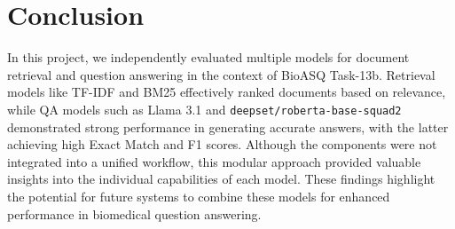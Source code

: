 \documentclass{article}
\begin{document}
\section{Conclusion}
In this project, we independently evaluated multiple models for document retrieval and question answering in the context of BioASQ Task-13b. Retrieval models like TF-IDF and BM25 effectively ranked documents based on relevance, while QA models such as Llama 3.1 and \texttt{deepset/roberta-base-squad2} demonstrated strong performance in generating accurate answers, with the latter achieving high Exact Match and F1 scores. Although the components were not integrated into a unified workflow, this modular approach provided valuable insights into the individual capabilities of each model. These findings highlight the potential for future systems to combine these models for enhanced performance in biomedical question answering.


\end{document}
